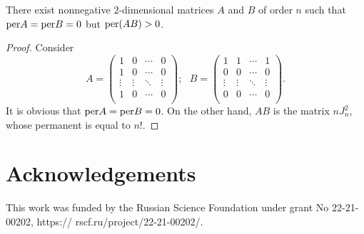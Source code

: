 \documentclass[a4paper]{article}
\begin{document}
\begin{zam}
There exist nonnegative $2$-dimensional matrices $A$ and $B$ of order $n$ such that ${\rm per} A = {\rm per} B = 0$ but ${\rm per} (AB) >0$.
\end{zam}

\begin{proof}
Consider
$$
A = \left( 
\begin{array}{cccc}
1 & 0 & \cdots  & 0 \\
1 & 0 & \cdots &  0 \\
\vdots  & \vdots  & \ddots  & \vdots \\
1 & 0 & \cdots &  0 \\
\end{array}
\right) ;~~~
B = \left( 
\begin{array}{cccc}
1 & 1 & \cdots  & 1 \\
0 & 0 & \cdots &  0 \\
\vdots  & \vdots  & \ddots  & \vdots \\
0 & 0 & \cdots &  0 \\
\end{array}
\right).
$$
It is obvious that ${\rm per} A = {\rm per} B = 0$. On the other hand, $AB$ is the matrix $n J_n^2$, whose permanent is equal to $n!$. 
\end{proof}



\section*{Acknowledgements}
This work was funded by the Russian Science Foundation under grant No 22-21-00202, https:// rscf.ru/project/22-21-00202/.




\begin{bibdiv}
    \begin{biblist}[\normalsize]
    \end{biblist}
    \end{bibdiv} 
\end{document}
